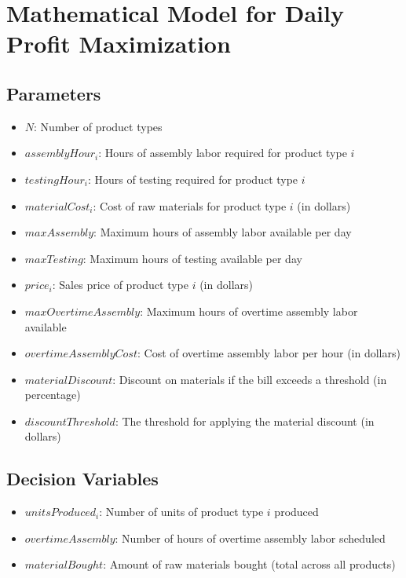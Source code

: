 \documentclass{article}
\begin{document}
\section*{Mathematical Model for Daily Profit Maximization}

\subsection*{Parameters}
\begin{itemize}
    \item $N$: Number of product types
    \item $assemblyHour_i$: Hours of assembly labor required for product type $i$ 
    \item $testingHour_i$: Hours of testing required for product type $i$
    \item $materialCost_i$: Cost of raw materials for product type $i$ (in dollars)
    \item $maxAssembly$: Maximum hours of assembly labor available per day
    \item $maxTesting$: Maximum hours of testing available per day
    \item $price_i$: Sales price of product type $i$ (in dollars)
    \item $maxOvertimeAssembly$: Maximum hours of overtime assembly labor available
    \item $overtimeAssemblyCost$: Cost of overtime assembly labor per hour (in dollars)
    \item $materialDiscount$: Discount on materials if the bill exceeds a threshold (in percentage)
    \item $discountThreshold$: The threshold for applying the material discount (in dollars)
\end{itemize}

\subsection*{Decision Variables}
\begin{itemize}
    \item $unitsProduced_i$: Number of units of product type $i$ produced
    \item $overtimeAssembly$: Number of hours of overtime assembly labor scheduled
    \item $materialBought$: Amount of raw materials bought (total across all products)
\end{itemize}
\end{document}
